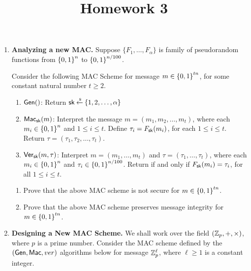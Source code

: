 \documentclass[11pt]{article}
\newcommand{\nextoddpage}{\checkoddpage\ifoddpage{\ \newpage\ \newpage}\else{\ \newpage}\fi}
\begin{document}
\title{Homework 3}

\date{}

\maketitle 

\thispagestyle{fancy}  
\pagestyle{fancy}      




\begin{enumerate}

\item {\bfseries Analyzing a new MAC.} 
  Suppose $\{F_1,\dotsc,F_\alpha\}$ is family of pseudorandom functions from ${\{0,1\}}^n$ to ${\{0,1\}}^{n/100}$. 
  
  Consider the following MAC Scheme for message $m \in {\{0,1\}}^{tn}$, for some constant natural number $t\geq 2$. 
  \begin{boxedalgo}
  \begin{enumerate}
  \item $\mathsf{Gen}()$: Return $\mathsf{sk}\mathbin{\stackrel{\mbox{\,\tiny \$}}{\gets}}\{1,2,\dotsc,\alpha\}$ 
  \item $\mathsf{Mac}_\mathsf{sk}(m)$: Interpret the message $m=(m_1,m_2,\dotsc,m_t)$, where each $m_i\in{\{0,1\}}^n$ and $1\leq i\leq t$. 
    Define $\tau_i = F_\mathsf{sk}(m_i)$, for each $1\leq i\leq t$. 
    Return $\tau = (\tau_1,\tau_2,\dotsc,\tau_t)$. 
  \item $\mathsf{Ver}_\mathsf{sk}(m,\tau)$: Interpret $m=(m_1,\dotsc,m_t)$ and $\tau=(\tau_1,\dotsc,\tau_t)$, where each $m_i\in{\{0,1\}}^n$ and $\tau_i\in{\{0,1\}}^{n/100}$. 
    Return  if and only if $F_\mathsf{sk}(m_i)=\tau_i$, for all $1\leq i\leq t$. 
  \end{enumerate}
  \end{boxedalgo} 
  
  \begin{enumerate}
  \item Prove that the above MAC scheme is not secure for $m\in{\{0,1\}}^{tn}$. 
  \item Prove that the above MAC scheme preserves message integrity for $m\in{\{0,1\}}^{tn}$. 
  \end{enumerate} 


  
\nextoddpage 
\item {\bfseries Designing a New MAC Scheme.}
  We shall work over the field $({\mathbb Z}_p,+,\times)$, where $p$ is a prime number. 
  Consider the MAC scheme defined by the $(\mathsf{Gen},\mathsf{Mac},ver)$ algorithms below for message ${\mathbb Z}_p^\ell$, where $\ell\geq 1$ is a constant integer. 
  

\end{enumerate}
\end{document}
